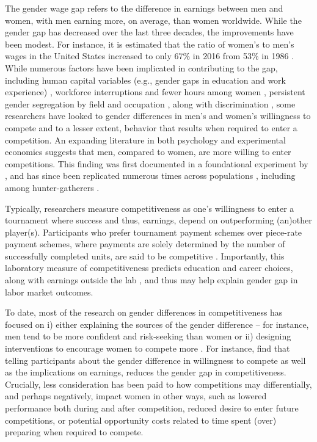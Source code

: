 \documentclass[a4paper, nobind]{templates/ociamthesis}
\begin{document}
The gender wage gap refers to the difference in earnings between men and women, with men earning more, on average, than women worldwide. While the gender gap has decreased over the last three decades, the improvements have been modest. For instance, it is estimated that the ratio of women's to men's wages in the United States increased to only 67\% in 2016 from 53\% in 1986 \autocite{Gharehgozli2020}. While numerous factors have been implicated in contributing to the gap, including human capital variables (e.g., gender gaps in education and work experience) \autocite{Goldin2006a}, workforce interruptions and fewer hours among women \autocite{Blau2017a}, persistent gender segregation by field and occupation \autocite{Blau2017,Goldin2014}, along with discrimination \autocite{Blau2017}, some researchers have looked to gender differences in men's and women's willingness to compete and to a lesser extent, behavior that results when required to enter a competition. An expanding literature in both psychology and experimental economics suggests that men, compared to women, are more willing to enter competitions. This finding was first documented in a foundational experiment by \textcite{Niederle2007}, and has since been replicated numerous times across populations \autocites[for reviews, see][]{Croson2009,Niederle2011,Niederle2017a}[and][]{Shurchkov2018}, including among hunter-gatherers \autocite{Apicella2015}.

Typically, researchers measure competitiveness as one's willingness to enter a tournament where success and thus, earnings, depend on outperforming (an)other player(s). Participants who prefer tournament payment schemes over piece-rate payment schemes, where payments are solely determined by the number of successfully completed units, are said to be competitive \autocite{Niederle2007}. Importantly, this laboratory measure of competitiveness predicts education and career choices, along with earnings outside the lab \autocite{Buser2014,Zhang2012,Buser2017c,Samek2019,Berge2015,Reuben2015,Reuben2017,Buser2017b,Buser2020a}, and thus may help explain gender gap in labor market outcomes.

To date, most of the research on gender differences in competitiveness has focused on i) either explaining the sources of the gender difference -- for instance, men tend to be more confident and risk-seeking than women \autocite[e.g.,][]{Veldhuizen2017} or ii) designing interventions to encourage women to compete more \autocite{Balafoutas2012,Sutter2016,Cassar2016,Brandts2015,Niederle2013,Brandts2015,Healy2011,Alan2018}. For instance, \textcite{Kessel2021} find that telling participants about the gender difference in willingness to compete as well as the implications on earnings, reduces the gender gap in competitiveness. Crucially, less consideration has been paid to how competitions may differentially, and perhaps negatively, impact women in other ways, such as lowered performance both during and after competition, reduced desire to enter future competitions, or potential opportunity costs related to time spent (over) preparing when required to compete.
\end{document}
